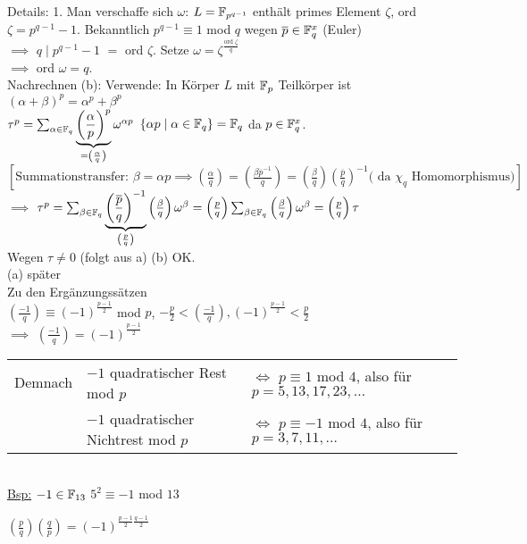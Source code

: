 \documentclass[a4paper,DIV15,BCOR12mm]{article}
\begin{document}
\begin{beweis}
Details: 1. Man verschaffe sich $\omega$: $L = \mathbb{F}_{p^{q-1}}$ enthält primes Element $\zeta$, ord $\zeta=p^{q-1}-1$. Bekanntlich $p^{q-1} \equiv 1$ mod $q$ wegen $\overline p \in \mathbb{F}_q^x$ (Euler) \\
$\implies$ $q \mid p^{q-1}-1$ $=$ ord $\zeta$. Setze $\omega=\zeta^\frac{\mbox{ord }\zeta}{q}$ \\
$\implies$ ord $\omega=q$. \\
Nachrechnen (b): Verwende: In Körper $L$ mit $\mathbb{F}_p$ Teilkörper ist $(\alpha + \beta)^p=\alpha^p + \beta^p$ \\
$\tau^p=\sum_{\alpha \in \mathbb{F}_q}\underbrace{\left(\frac{\alpha}{p}\right)^p}_{=\left(\frac{\alpha}{q}\right)}\omega^{\alpha p}$ \quad$\left\{\alpha p \mid \alpha \in \mathbb{F}_q\right\} = \mathbb{F}_q$ da $p\in\mathbb{F}_q^x$.\\
$\left[\mbox{Summationstransfer: }\beta=\alpha p\implies\left(\frac{\alpha}{q}\right)=\left(\frac{\beta \overline p ^{-1}}{q}\right) = \left(\frac{\beta}{q}\right)\left(\frac{\overline p}{q}\right)^{-1}\mbox{( da $\chi_q$ Homomorphismus)}\right]$\\
$\implies$ $\tau^p=\sum_{\beta \in \mathbb{F}_q}\underbrace{\left(\frac{\overline p}{q}\right)^{-1}}_{\left(\frac{p}{q}\right)}\left(\frac{\beta}{q}\right)\omega^\beta = \left(\frac{p}{q}\right) \sum_{\beta \in \mathbb{F}_q} \left(\frac{\beta}{q}\right)\omega^\beta = \left(\frac{p}{q}\right)\tau$ \\
Wegen $\tau \neq 0$ (folgt aus a) (b) OK.\\
(a) später \\
Zu den Ergänzungssätzen\\
$\left(\frac{-1}{q}\right) \equiv (-1)^\frac{p-1}{2}$ mod $p$, $-\frac{p}{2} < \left(\frac{-1}{q}\right),(-1)^\frac{p-1}{2}<\frac{p}{2}$ \\
$\implies$ $\left(\frac{-1}{q}\right)=(-1)^\frac{p-1}{2}$\\
\begin{tabular}{lll}
Demnach & $-1$ quadratischer Rest mod $p$ & $\iff$ $p\equiv 1$ mod $4$, also für $p=5,13,17,23,\dotsc$ \\
        & $-1$ quadratischer Nichtrest mod $p$ &  $\iff$ $p\equiv -1$ mod $4$, also für $p=3,7,11,\dotsc$ \\
\end{tabular}\\
\underline{Bsp:} $-1\in\mathbb{F}_{13}$ $5^2 \equiv -1$ mod $13$
\end{beweis}

$\left(\frac{p}{q}\right)\left(\frac{q}{p}\right) =
(-1)^{\frac{p-1}{2} \frac{q-1}{2}}$
\end{document}
